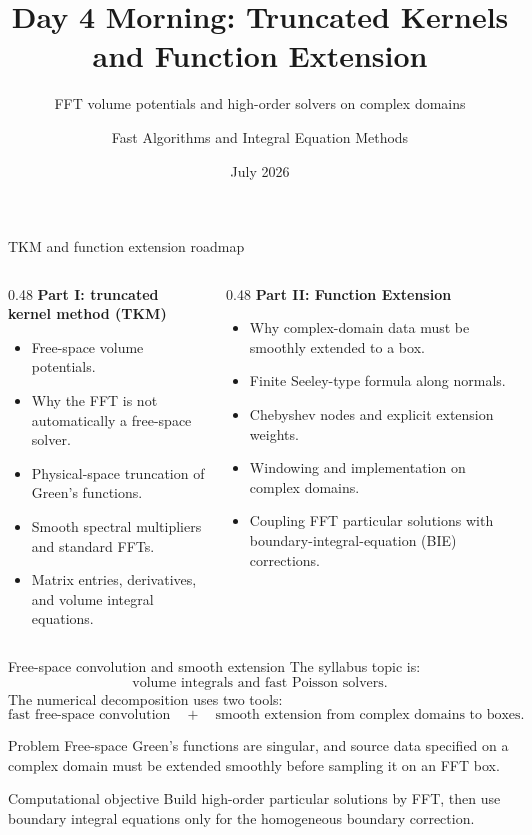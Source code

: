 \documentclass[aspectratio=169,11pt]{beamer}
\title{Day 4 Morning: Truncated Kernels and Function Extension}
\subtitle{FFT volume potentials and high-order solvers on complex domains}
\author{Fast Algorithms and Integral Equation Methods}
\institute{AMSS Summer Course}
\date{July 2026}
\begin{document}
\begin{frame}
  \titlepage
\end{frame}

\begin{frame}{TKM and function extension roadmap}
\small
\begin{columns}[T,totalwidth=\textwidth]
\begin{column}{0.48\textwidth}
\textbf{Part I: truncated kernel method (TKM)}
\begin{itemize}
  \item Free-space volume potentials.
  \item Why the FFT is not automatically a free-space solver.
  \item Physical-space truncation of Green's functions.
  \item Smooth spectral multipliers and standard FFTs.
  \item Matrix entries, derivatives, and volume integral equations.
\end{itemize}
\end{column}
\begin{column}{0.48\textwidth}
\textbf{Part II: Function Extension}
\begin{itemize}
  \item Why complex-domain data must be smoothly extended to a box.
  \item Finite Seeley-type formula along normals.
  \item Chebyshev nodes and explicit extension weights.
  \item Windowing and implementation on complex domains.
  \item Coupling FFT particular solutions with boundary-integral-equation (BIE) corrections.
\end{itemize}
\end{column}
\end{columns}
\end{frame}

\begin{frame}{Free-space convolution and smooth extension}
\small
The syllabus topic is:
\[
  \text{volume integrals and fast Poisson solvers.}
\]
The numerical decomposition uses two tools:
\[
  \boxed{\text{fast free-space convolution}}
  \quad+\quad
  \boxed{\text{smooth extension from complex domains to boxes}}.
\]

\begin{block}{Problem}
Free-space Green's functions are singular, and source data specified on a
complex domain must be extended smoothly before sampling it on an FFT box.
\end{block}

\begin{block}{Computational objective}
Build high-order particular solutions by FFT, then use boundary integral
equations only for the homogeneous boundary correction.
\end{block}
\end{frame}
\end{document}
